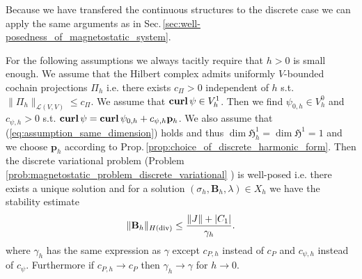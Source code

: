 \documentclass[../master_thesis.tex]{subfiles}
\begin{document}
Because we have transfered the continuous structures to the discrete case 
we can apply the same arguments as in Sec.\,\ref{sec:well-posedness_of_magnetostatic_system}.


\begin{theorem}
    For the following assumptions we always tacitly require that 
    $h>0$ is small enough. We assume that the Hilbert complex admits uniformly $V$-bounded 
    cochain projections $\Pi_h$ i.e. 
    there exists $c_\Pi > 0$ independent of $h$ s.t. $\lVert \Pi_h \rVert _{\mathcal{L}(V,V)} \leq c_\Pi$.
    We assume that $\veccurl \psi \in V_h^1$. Then we find 
    $\psi_{0,h} \in V_h^0$ and $c_{\psi,h}>0$ 
    s.t. $\veccurl \psi  = \veccurl \psi_{0,h} + c_{\psi,h}\mathbf{p}_h$.
    We also assume that (\ref{eq:assumption_same_dimension}) holds and thus 
    $\dim \mathfrak{H}^1_h = \dim \mathfrak{H}^1 = 1$ and we choose 
    $\mathbf{p}_h$ according to Prop.\,\ref{prop:choice_of_discrete_harmonic_form}.
    Then the discrete variational problem (Problem \ref{prob:magnetostatic_problem_discrete_variational} )
    is well-posed i.e. there exists a 
    unique solution and for a solution $(\sigma_h, \mathbf{B}_h,\lambda) \in X_h$
    we have the stability estimate 
    \begin{align*}
        \lVert \mathbf{B}_h \rVert _{H(\operatorname{div})} 
        \leq \frac{\lVert J \rVert + |C_1|}{\gamma_h}.
    \end{align*}
    where $\gamma_h$ has the same expression as $\gamma$ except  
    $c_{P,h}$ instead of $c_P$ and $c_{\psi,h}$ instead of $c_{\psi}$.
    Furthermore if $c_{P,h} \rightarrow c_P$ then $\gamma_h \rightarrow \gamma$ for $h \rightarrow 0$.
\end{theorem}
\end{document}
